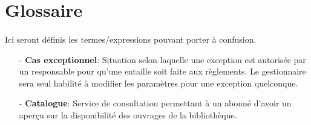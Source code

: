 \section*{Glossaire}
\paragraph{} Ici seront définis les termes/expressions pouvant porter à confusion.\par
 \begin{enumerate}
     \item[-] \textbf{Cas exceptionnel}: Situation selon laquelle une exception est autorisée 
     par un responsable pour qu’une entaille soit faite aux règlements. 
     Le gestionnaire sera seul habilité à modifier les paramètres pour une 
     exception quelconque.
     \item[-] \textbf{Catalogue}: Service de consultation permettant à un abonné d’avoir 
     un aperçu sur la disponibilité des ouvrages de la bibliothèque.
    
 \end{enumerate}
  